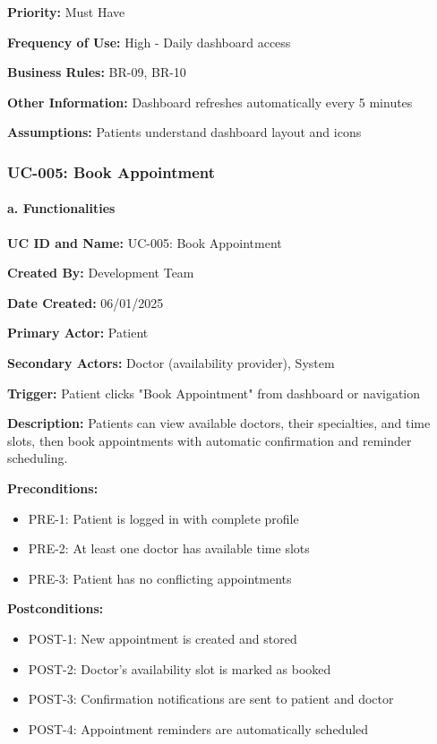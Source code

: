 \documentclass[12pt,a4paper]{article}
\begin{document}
\textbf{Priority:} Must Have

\textbf{Frequency of Use:} High - Daily dashboard access

\textbf{Business Rules:} BR-09, BR-10

\textbf{Other Information:} Dashboard refreshes automatically every 5 minutes

\textbf{Assumptions:} Patients understand dashboard layout and icons

\subsubsection{UC-005: Book Appointment}

\paragraph{a. Functionalities}

\textbf{UC ID and Name:} UC-005: Book Appointment

\textbf{Created By:} Development Team

\textbf{Date Created:} 06/01/2025

\textbf{Primary Actor:} Patient

\textbf{Secondary Actors:} Doctor (availability provider), System

\textbf{Trigger:} Patient clicks "Book Appointment" from dashboard or navigation

\textbf{Description:} Patients can view available doctors, their specialties, and time slots, then book appointments with automatic confirmation and reminder scheduling.

\textbf{Preconditions:}
\begin{itemize}
\item PRE-1: Patient is logged in with complete profile
\item PRE-2: At least one doctor has available time slots
\item PRE-3: Patient has no conflicting appointments
\end{itemize}

\textbf{Postconditions:}
\begin{itemize}
\item POST-1: New appointment is created and stored
\item POST-2: Doctor's availability slot is marked as booked
\item POST-3: Confirmation notifications are sent to patient and doctor
\item POST-4: Appointment reminders are automatically scheduled
\end{itemize}
\end{document}
